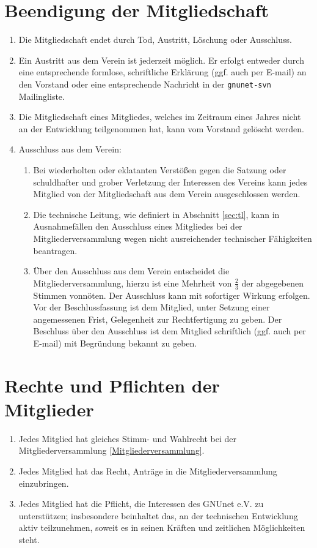 \documentclass[german,a4paper]{article} %
\newenvironment{enumpar}{%
  \renewcommand{\labelenumi}{\theenumi}%
  \renewcommand{\theenumi}{(\arabic{enumi})}%
  \renewcommand{\labelenumii}{\theenumii}%
  \renewcommand{\theenumii}{(\alph{enumii})}%
  \begin{enumerate}}
{\end{enumerate}}
\begin{document}
\section{Beendigung der Mitgliedschaft}
\begin{enumpar}
\item Die Mitgliedschaft endet durch Tod, Austritt, Löschung oder Ausschluss.
\item Ein Austritt aus dem Verein ist jederzeit möglich. Er erfolgt entweder durch eine entsprechende formlose, schriftliche Erklärung (ggf. auch per E-mail) an den Vorstand oder eine entsprechende Nachricht in der {\tt gnunet-svn} Mailingliste.
\item Die Mitgliedschaft eines Mitgliedes, welches im Zeitraum eines Jahres nicht an der Entwicklung teilgenommen hat, kann vom Vorstand gelöscht werden.
\item Ausschluss aus dem Verein:
\begin{enumpar}
\item Bei wiederholten oder eklatanten Verstößen gegen die Satzung oder schuldhafter und grober Verletzung der Interessen des Vereins kann jedes Mitglied von der Mitgliedschaft aus dem Verein ausgeschlossen werden.
\item Die technische Leitung, wie definiert in Abschnitt \ref{sec:tl}, kann in Ausnahmefällen den Ausschluss eines Mitgliedes bei der Mitgliederversammlung wegen nicht ausreichender technischer Fähigkeiten beantragen.
\item Über den Ausschluss aus dem Verein entscheidet die Mitgliederversammlung, hierzu ist eine Mehrheit von $\frac{2}{3}$ der abgegebenen Stimmen vonnöten. Der Ausschluss kann mit sofortiger Wirkung erfolgen. Vor der Beschlussfassung ist dem Mitglied, unter Setzung einer angemessenen Frist, Gelegenheit zur Rechtfertigung zu geben. Der Beschluss über den Ausschluss ist dem Mitglied schriftlich (ggf. auch per E-mail) mit Begründung bekannt zu geben.
\end{enumpar}
\end{enumpar}

\section{Rechte und Pflichten der Mitglieder}
\label{Pflichten}
\begin{enumpar}
\item Jedes Mitglied hat gleiches Stimm- und Wahlrecht bei der Mitgliederversammlung \ref{Mitgliederversammlung}.
\item Jedes Mitglied hat das Recht, Anträge in die Mitgliederversammlung einzubringen.
\item Jedes Mitglied hat die Pflicht, die Interessen des GNUnet e.V. zu unterstützen; insbesondere beinhaltet das, an der technischen Entwicklung aktiv teilzunehmen, soweit es in seinen Kräften und zeitlichen Möglichkeiten steht.
\end{enumpar}
\end{document}
